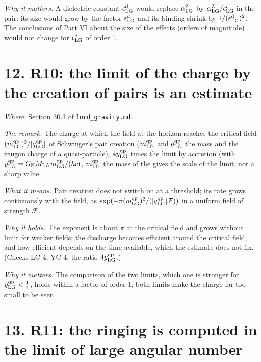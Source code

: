 \documentclass[
  10pt,
]{article}
\begin{document}
\emph{Why it matters.} A dielectric constant
\(\epsilon^{\rm d}_{\rm LG}\) would replace \(\alpha^{\rm Z}_{\rm LG}\)
by \(\alpha^{\rm Z}_{\rm LG}/\epsilon^{\rm d}_{\rm LG}\) in the pair:
its size would grow by the factor \(\epsilon^{\rm d}_{\rm LG}\) and its
binding shrink by \(1/(\epsilon^{\rm d}_{\rm LG})^2\). The conclusions
of Part VI about the size of the effects (orders of magnitude) would not
change for \(\epsilon^{\rm d}_{\rm LG}\) of order 1.

\hypertarget{r10-the-limit-of-the-charge-by-the-creation-of-pairs-is-an-estimate}{%
\section{12. R10: the limit of the charge by the creation of pairs is an
estimate}\label{r10-the-limit-of-the-charge-by-the-creation-of-pairs-is-an-estimate}}

\emph{Where.} Section 30.3 of \texttt{lord\_gravity.md}.

\emph{The remark.} The charge at which the field at the horizon reaches
the critical field
\((m^{\rm qp}_{\rm LG})^2/\lvert q^{\rm qp}_{\rm LG}\rvert\) of
Schwinger's pair creation (\(m^{\rm qp}_{\rm LG}\) and
\(q^{\rm qp}_{\rm LG}\) the mass and the zeugon charge of a
quasi-particle), \(4y^{\rm qp}_{\rm LG}\) times the limit by accretion
(with
\(y^{\rm qp}_{\rm LG}=G_{\rm N}M_{\rm LG}m^{\rm qp}_{\rm LG}/(\hbar c)\),
\(m^{\rm qp}_{\rm LG}\) the mass of the gives the scale of the limit,
not a sharp value.

\emph{What it means.} Pair creation does not switch on at a threshold;
its rate grows continuously with the field, as
\(\exp(-\pi(m^{\rm qp}_{\rm LG})^2/(\lvert q^{\rm qp}_{\rm LG}\rvert\mathcal F))\)
in a uniform field of strength \(\mathcal F\).

\emph{Why it holds.} The exponent is about \(\pi\) at the critical field
and grows without limit for weaker fields; the discharge becomes
efficient around the critical field, and how efficient depends on the
time available, which the estimate does not fix. (Checks LC-4, YC-4: the
ratio \(4y^{\rm qp}_{\rm LG}\).)

\emph{Why it matters.} The comparison of the two limits, which one is
stronger for \(y^{\rm qp}_{\rm LG}<\tfrac14\), holds within a factor of
order 1; both limits make the charge far too small to be seen.

\hypertarget{r11-the-ringing-is-computed-in-the-limit-of-large-angular-number}{%
\section{13. R11: the ringing is computed in the limit of large angular
number}\label{r11-the-ringing-is-computed-in-the-limit-of-large-angular-number}}
\end{document}
